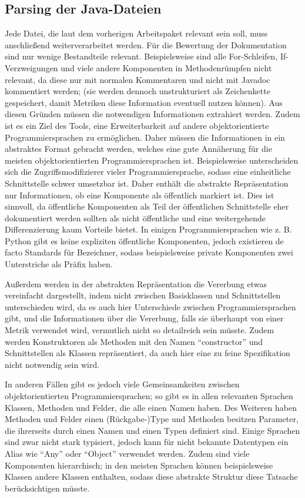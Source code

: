 \subsection{Parsing der Java-Dateien} 
Jede Datei, die laut dem vorherigen Arbeitspaket relevant sein soll, muss anschließend weiterverarbeitet werden. Für die Bewertung der Dokumentation sind nur wenige Bestandteile relevant. Beispielsweise sind alle For-Schleifen, If-Verzweigungen und viele andere Komponenten in Methodenrümpfen nicht relevant, da diese nur mit normalen Kommentaren und nicht mit Javadoc kommentiert werden; (sie werden dennoch unstrukturiert als Zeichenkette gespeichert, damit Metriken diese Information eventuell nutzen können). Aus diesen Gründen müssen die notwendigen Informationen extrahiert werden. Zudem ist es ein Ziel des Tools, eine Erweiterbarkeit auf andere objektorientierte Programmiersprachen zu ermöglichen. Daher müssen die Informationen in ein abstraktes Format gebracht werden, welches eine gute Annäherung für die meisten objektorientierten Programmiersprachen ist. Beispielsweise unterscheiden sich die Zugriffsmodifizierer vieler Programmiersprache, sodass eine einheitliche Schnittstelle schwer umsetzbar ist. Daher enthält die abstrakte Repräsentation nur Informationen, ob eine Komponente als öffentlich markiert ist. Dies ist sinnvoll, da öffentliche Komponenten als Teil der öffentlichen Schnittstelle eher dokumentiert werden sollten als nicht öffentliche und eine weitergehende Differenzierung kaum Vorteile bietet. In einigen Programmiersprachen wie z. B. Python gibt es keine expliziten öffentliche Komponenten, jedoch existieren de facto Standards für Bezeichner, sodass beispielsweise private Komponenten zwei Unterstriche als Präfix haben.

Außerdem werden in der abstrakten Repräsentation die Vererbung etwas vereinfacht dargestellt, indem nicht zwischen Basisklassen und Schnittstellen unterschieden wird, da es auch hier Unterschiede zwischen Programmiersprachen gibt, und die Informationen über die Vererbung, falls sie überhaupt von einer Metrik verwendet wird, vermutlich nicht so detailreich sein müsste. Zudem werden Konstruktoren als Methoden mit den Namen \enquote{constructor} und Schnittstellen als Klassen repräsentiert, da auch hier eine zu feine Spezifikation nicht notwendig sein wird.  

  

In anderen Fällen gibt es jedoch viele Gemeinsamkeiten zwischen objektorientierten Programmiersprachen; so gibt es in  allen relevanten Sprachen Klassen, Methoden und Felder, die alle einen Namen haben. Des Weiteren haben Methoden und Felder einen (Rückgabe-)Type und Methoden besitzen Parameter, die ihrerseits durch einen Namen und einen Typen definiert sind. Einige Sprachen sind zwar nicht stark typisiert, jedoch kann für nicht bekannte Datentypen ein Alias wie \enquote{Any} oder  \enquote{Object} verwendet werden.  Zudem sind viele Komponenten hierarchisch; in den meisten Sprachen können beispielsweise Klassen andere Klassen enthalten, sodass diese abstrakte Struktur diese Tatsache berücksichtigen müsste. 

